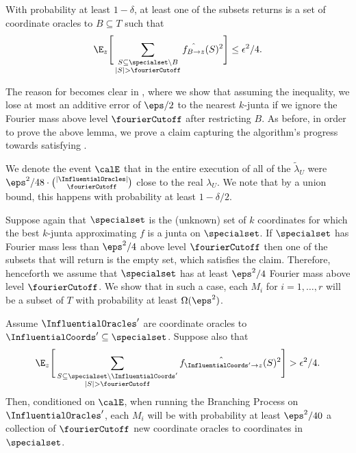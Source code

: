 \begin{lemma}
\label{lemma:phase-one-correctness}
With probability at least $1-\delta$, at least one of the subsets  returns is a set of coordinate oracles  to  $B\subseteq T$  such that
\begin{equation}\label{eq:B T condition}
\E_z\Bigg[\sum_{\substack{S \subseteq \specialset\setminus B \\ |S| > \fourierCutoff}} \hat{f_{B \to z}}(S)^2\Bigg] \leq \epsilon^2/4.	
\end{equation}
\end{lemma}
%
The reason for  becomes clear in , where we show that assuming the inequality, we lose at most an additive error of $\eps/2$ to the nearest $k$-junta if we ignore the Fourier mass above level $\fourierCutoff$ after restricting $B$. 
As before, in order to prove the above lemma, we prove a claim capturing the algorithm's progress towards satisfying .

We denote the event $\calE$ that in the entire execution of  all of the $\tilde{\lambda}_U$ were $\eps^2/48 \cdot \binom{|\InfluentialOracles|}{\fourierCutoff}$ close to the real $\lambda_U$. We note that by a union bound,  this happens with probability at least $1-\delta/2$. 

Suppose again that $\specialset$ is the (unknown) set of $k$ coordinates for which the best $k$-junta approximating $f$ is a junta on $\specialset$. 
If $\specialset$ has Fourier mass less than $\eps^2/4$ above level $\fourierCutoff$ then one of the subsets that  will return is the empty set, which satisfies the claim. Therefore, henceforth we assume that $\specialset$ has at least $\eps^2/4$ Fourier mass above level $\fourierCutoff$. 
We show that in such a case, each $M_i$ for $i=1, \ldots, r$ will be a subset of $T$ with probability at least $\Omega(\eps^2)$.


\begin{claim}
\label{claim:prob-of-sample}
Assume $\InfluentialOracles'$ are coordinate oracles to $\InfluentialCoords' \subseteq \specialset$.
Suppose also that 
$$\E_z\Bigg[\sum_{\substack{S \subseteq \specialset\setminus \InfluentialCoords' \\ |S| > \fourierCutoff}} \hat{f_{\InfluentialCoords' \to z}}(S)^2\Bigg]  > \epsilon^2/4.$$
Then, conditioned on $\calE$, when running the Branching Process on $\InfluentialOracles'$, each $M_i$ will be with probability at least $\eps^2/40$  a collection of $\fourierCutoff$ new coordinate oracles to coordinates in  $\specialset$.
%
%
%
\end{claim}

